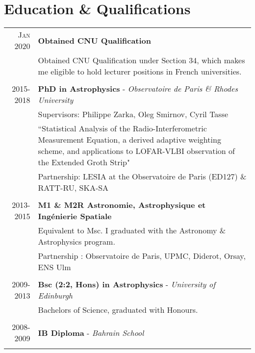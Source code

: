 \documentclass[10pt]{article} %
\begin{document}
\section{Education \& Qualifications}

\begin{tabular}{r|p{12.5cm}}
	\textsc{Jan 2020} & \textbf{Obtained CNU Qualification}\\
	& Obtained CNU Qualification under Section 34, which makes me eligible to hold lecturer positions in French universities.\\
	\multicolumn{2}{c}{} \\

\textsc{2015-2018} & \textbf{PhD in Astrophysics} - \textit{Observatoire de Paris \& Rhodes University}\\
& Supervisors: Philippe Zarka, Oleg Smirnov, Cyril Tasse\\
& ``Statistical Analysis of the Radio-Interferometric Measurement Equation,
a derived adaptive weighting scheme, and applications to LOFAR-VLBI
observation of the Extended Groth Strip"\\
& Partnership: LESIA at the Observatoire de Paris (ED127) \& RATT-RU, SKA-SA\\
\multicolumn{2}{c}{} \\

\textsc{2013-2015} & \textbf{M1 \& M2R Astronomie, Astrophysique et Ingénierie Spatiale} \\
& Equivalent to Msc. I graduated with the Astronomy \& Astrophysics program.\\
& Partnership : Observatoire de Paris, UPMC, Diderot, Orsay, ENS Ulm\\
\multicolumn{2}{c}{} \\


\textsc{2009-2013} & \textbf{Bsc (2:2, Hons) in Astrophysics} - \textit{University of Edinburgh} \\
& Bachelors of Science, graduated with Honours.\\
\multicolumn{2}{c}{} \\

\textsc{2008-2009} & \textbf{IB Diploma} - \textit{Bahrain School} \\
\multicolumn{2}{c}{} \\

\end{tabular}
\end{document}

